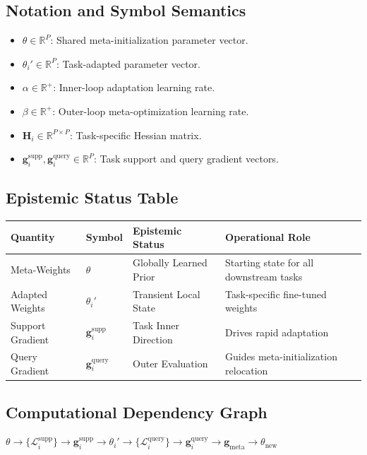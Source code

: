 \documentclass[11pt,a4paper]{article}
\theoremstyle{definition}
\begin{document}
\subsection{Notation and Symbol Semantics}
\begin{itemize}
    \item $\theta \in \mathbb{R}^P$: Shared meta-initialization parameter vector.
    \item $\theta_i' \in \mathbb{R}^P$: Task-adapted parameter vector.
    \item $\alpha \in \mathbb{R}^+$: Inner-loop adaptation learning rate.
    \item $\beta \in \mathbb{R}^+$: Outer-loop meta-optimization learning rate.
    \item $\mathbf{H}_i \in \mathbb{R}^{P \times P}$: Task-specific Hessian matrix.
    \item $\mathbf{g}_i^{\text{supp}}, \mathbf{g}_i^{\text{query}} \in \mathbb{R}^P$: Task support and query gradient vectors.
\end{itemize}

\subsection{Epistemic Status Table}
\begin{table}[h]
\centering
\small
\begin{tabular}{@{}llll@{}}
\toprule
\textbf{Quantity} & \textbf{Symbol} & \textbf{Epistemic Status} & \textbf{Operational Role} \\
\midrule
Meta-Weights & $\theta$ & Globally Learned Prior & Starting state for all downstream tasks \\
Adapted Weights & $\theta_i'$ & Transient Local State & Task-specific fine-tuned weights \\
Support Gradient & $\mathbf{g}_i^{\text{supp}}$ & Task Inner Direction & Drives rapid adaptation \\
Query Gradient & $\mathbf{g}_i^{\text{query}}$ & Outer Evaluation & Guides meta-initialization relocation \\
\bottomrule
\end{tabular}
\end{table}

\subsection{Computational Dependency Graph}
{\centering
$\theta \longrightarrow \{\mathcal{L}_i^{\text{supp}}\} \longrightarrow \mathbf{g}_i^{\text{supp}} \longrightarrow \theta_i' \longrightarrow \{\mathcal{L}_i^{\text{query}}\} \longrightarrow \mathbf{g}_i^{\text{query}} \longrightarrow \mathbf{g}_{\text{meta}} \longrightarrow \theta_{\text{new}}$
\par}
\end{document}
